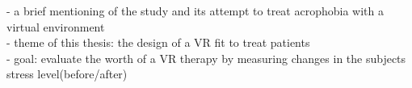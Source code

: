 

- a brief mentioning of the study and its attempt to treat acrophobia with a virtual environment\\
- theme of this thesis: the design of a VR fit to treat patients\\
- goal: evaluate the worth of a VR therapy by measuring changes in the subjects stress level(before/after)